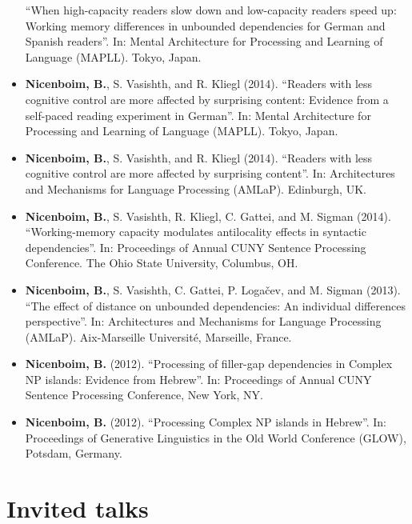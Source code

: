 \documentclass[]{article}
\begin{document}
\begin{itemize}
  ``When high-capacity readers slow down and low-capacity readers speed
  up: Working memory differences in unbounded dependencies for German
  and Spanish readers''. In: Mental Architecture for Processing and
  Learning of Language (MAPLL). Tokyo, Japan.
\item
  \textbf{Nicenboim, B.}, S. Vasishth, and R. Kliegl (2014). ``Readers
  with less cognitive control are more affected by surprising content:
  Evidence from a self-paced reading experiment in German''. In: Mental
  Architecture for Processing and Learning of Language (MAPLL). Tokyo,
  Japan.
\item
  \textbf{Nicenboim, B.}, S. Vasishth, and R. Kliegl (2014). ``Readers
  with less cognitive control are more affected by surprising content''.
  In: Architectures and Mechanisms for Language Processing (AMLaP).
  Edinburgh, UK.
\item
  \textbf{Nicenboim, B.}, S. Vasishth, R. Kliegl, C. Gattei, and M.
  Sigman (2014). ``Working-memory capacity modulates antilocality
  effects in syntactic dependencies''. In: Proceedings of Annual CUNY
  Sentence Processing Conference. The Ohio State University, Columbus,
  OH.
\item
  \textbf{Nicenboim, B.}, S. Vasishth, C. Gattei, P. Logačev, and M.
  Sigman (2013). ``The effect of distance on unbounded dependencies: An
  individual differences perspective''. In: Architectures and Mechanisms
  for Language Processing (AMLaP). Aix-Marseille Université, Marseille,
  France.
\item
  \textbf{Nicenboim, B.} (2012). ``Processing of filler-gap dependencies
  in Complex NP islands: Evidence from Hebrew''. In: Proceedings of
  Annual CUNY Sentence Processing Conference, New York, NY.
\item
  \textbf{Nicenboim, B.} (2012). ``Processing Complex NP islands in
  Hebrew''. In: Proceedings of Generative Linguistics in the Old World
  Conference (GLOW), Potsdam, Germany.

   
\end{itemize}

\hypertarget{invited-talks}{%
\section{Invited talks}\label{invited-talks}}
\end{document}
